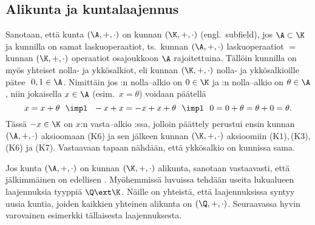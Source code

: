 \subsection*{Alikunta ja kuntalaajennus}

Sanotaan, että kunta $(\A,+,\cdot)$ on kunnan $(\K,+,\cdot)$  (engl.\ subfield),
jos $\A \subset \K$ ja kunnilla on samat laskuoperaatiot, ts.\ kunnan $(\A,+,\cdot)$ 
laskuoperaatiot $=$ kunnan $(\K,+,\cdot)$ operaatiot osajoukkoon $\A$ rajoitettuina. Tällöin 
kunnilla on myös yhteiset nolla- ja ykkösalkiot, eli kunnan $(\K,+,\cdot)$ nolla- ja 
ykkösalkioille pätee $\ 0,1 \in \A$. Nimittäin jos \K:n nolla--alkio on $0 \in \K$ ja \A:n 
nolla--alkio on $\theta \in \A$, niin jokaisella $x \in \A$ (esim.\ $x=\theta$) voidaan päätellä
\[
x = x + \theta \ \ \impl \ \ -x + x = -x + x + \theta \ \ 
                     \impl \ \ 0 = 0+\theta = \theta+0 = \theta.
\]
Tässä $-x \in \K$ on $x$:n vasta--alkio \K:ssa, jolloin päättely perustui ensin kunnan 
$(\A,+,\cdot)$ aksioomaan (K6) ja sen jälkeen kunnan $(\K,+,\cdot)$ aksioomiin (K1),\,(K3), (K6)
ja (K7). Vastaavaan tapaan nähdään, että ykkösalkio on kunnissa sama. 

Jos kunta $(\A,+,\cdot)$ on kunnan $(\K,+,\cdot)$ alikunta, sanotaan vastaavasti, että 
jälkimmäinen on edellisen \kor{kuntalaajennus}. Myöhemmissä luvuissa tehdään useita lukualueen
laajennuksia tyyppiä $\Q \ext \K$. Näille on yhteistä, että laajennuksissa syntyy uusia kuntia,
joiden kaikkien yhteinen alikunta on $(\Q,+,\cdot)$. Seuraavassa hyvin varovainen esimerkki
tällaisesta laajennuksesta.

